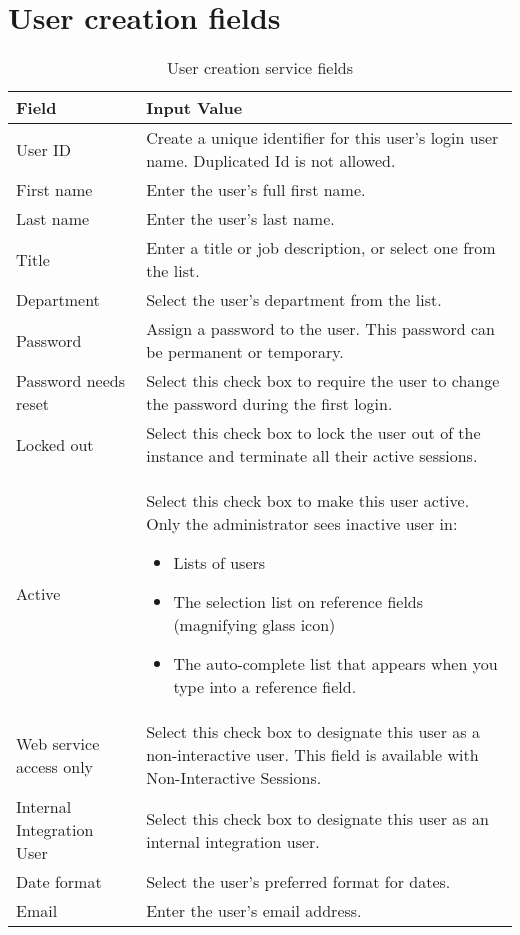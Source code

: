 \section{User creation fields}{} %

\begin{table}[H]
\centering
\caption{User creation service fields}
\begin{tabular}{|p{3cm}|p{12cm}|}
\hline
Field & Input Value \\ 
\hline
User ID & Create a unique identifier for this user's login user name. Duplicated Id is not allowed. \\ 
\hline
First name & Enter the user's full first name. \\ 
\hline
Last name & Enter the user's last name. \\ 
\hline
Title & Enter a title or job description, or select one from the list. \\ 
\hline
Department & Select the user's department from the list. \\ 
\hline
Password & Assign a password to the user. This password can be permanent or temporary. \\ 
\hline
Password needs reset & Select this check box to require the user to change the password during the first login. \\ 
\hline
Locked out & Select this check box to lock the user out of the instance and terminate all their active sessions. \\ 
\hline
Active & Select this check box to make this user active. Only the administrator sees inactive user in: 
\begin{itemize}
\item Lists of users 
\item The selection list on reference fields (magnifying glass icon) 
\item The auto-complete list that appears when you type into a reference field.
\end{itemize} \\ 
\hline
Web service access only & Select this check box to designate this user as a non-interactive user. This field is available with Non-Interactive Sessions. \\ \hline
Internal Integration User & Select this check box to designate this user as an internal integration user. \\ 
\hline
Date format & Select the user's preferred format for dates. \\ 
\hline
Email & Enter the user's email address. \\ 

\end{tabular}
\end{table}
